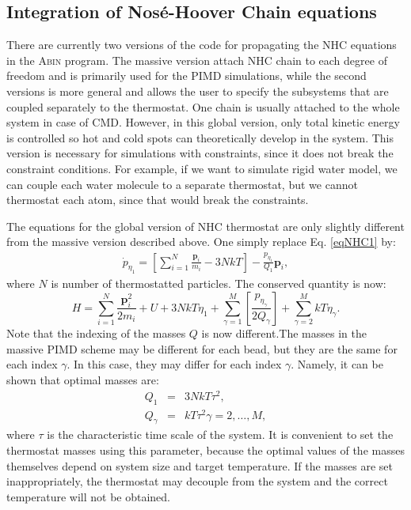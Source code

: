 \documentclass[12pt,a4paper]{article}
\begin{document}
\subsection{Integration of Nosé-Hoover Chain equations}
\label{sec:NHC}
There are currently two versions of the code for propagating the NHC equations in the \textsc{Abin} program. The massive version attach NHC chain to each degree of freedom and is primarily used for the PIMD simulations, while the second versions is more general and allows the user to specify the subsystems that are coupled separately to the thermostat. One chain is usually attached to the whole system in case of CMD. However, in this global version, only total kinetic energy is controlled so hot and cold spots can theoretically develop in the system. This version is necessary for simulations with constraints, since it does not break the constraint conditions. For example, if we want to simulate rigid water model, we can couple each water molecule to a separate thermostat, but we cannot thermostat each atom, since that would break the constraints. 

The equations for the global version of NHC thermostat are only slightly different from the massive version described above. One simply replace Eq. \ref{eqNHC1} by:
\begin{eqnarray}
\dot{p}_{\eta_1}=\left[\sum^N_{i=1}\frac{\mathbf{p}_i}{m_i}-3NkT\right]-\frac{p_{\eta_{1}}}{Q_1}\mathbf{p}_i ,
\end{eqnarray}
where $N$ is number of thermostatted particles. The conserved quantity is now:
\begin{equation}
H = \sum^N_{i=1}\frac{\mathbf{p}_i^2}{2m_i} + U + 3NkT\eta_1 + \sum_{\gamma=1}^M\left[\frac{p_{\eta_\gamma}}{2Q_\gamma}\right]+ \sum_{\gamma=2}^M kT\eta_\gamma   .
\end{equation}
Note that the indexing of the masses $Q$ is now different.The masses in the massive PIMD scheme may be different for each bead, but they are the same for each index $\gamma$. In this case, they may differ for each index $\gamma$. Namely, it can be shown that optimal masses are\cite{Martyna1992a}:
\begin{eqnarray}
Q_1&=&3NkT\tau^2   ,\\
Q_\gamma &=& kT\tau^2   \gamma =2,\dots, M , \nonumber
\end{eqnarray}
where $\tau$ is the characteristic time scale of the system. It is convenient to set the thermostat masses using this parameter, because the optimal values of the masses themselves depend on system size and target temperature. If the masses are set inappropriately, the thermostat may decouple from the system and the correct temperature will not be obtained.
\end{document}
